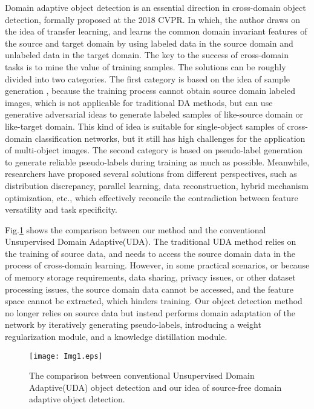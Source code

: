 \documentclass[sn-mathphys]{sn-jnl}%
\theoremstyle{thmstyleone}%
\theoremstyle{thmstyletwo}%
\theoremstyle{thmstylethree}%
\begin{document}
Domain adaptive object detection is an essential direction in cross-domain object detection, formally proposed at the 2018 CVPR\cite{chen2018domain}. In which, the author draws on the idea of transfer learning, and learns the common domain invariant features of the source and target domain by using labeled data in the source domain and unlabeled data in the target domain. The key to the success of cross-domain tasks is to mine the value of training samples. The solutions can be roughly divided into two categories. The first category is based on the idea of sample generation \cite{hou2021visualizing,kurmi2021domain,li2020model,kim2021domain}, because the training process cannot obtain source domain labeled images, which is not applicable for traditional DA methods\cite{xu2020exploring}, but can use generative adversarial ideas to generate labeled samples of like-source domain or like-target domain. This kind of idea is suitable for single-object samples of cross-domain classification networks, but it still has high challenges for the application of multi-object images. The second category is based on pseudo-label generation\cite{liang2020we,he2020domain} to generate reliable pseudo-labels during training as much as possible. Meanwhile, researchers have proposed several solutions from different perspectives, such as distribution discrepancy, parallel learning, data reconstruction, hybrid mechanism optimization, etc.\cite{han2019image,ben2019demystifying}, which effectively reconcile the contradiction between feature versatility and task specificity.

Fig.\ref{fig1} shows the comparison between our method and the conventional Unsupervised Domain Adaptive(UDA). The traditional UDA method relies on the training of source data, and needs to access the source domain data in the process of cross-domain learning. However, in some practical scenarios, or because of memory storage requirements, data sharing, privacy issues, or other dataset processing issues, the source domain data cannot be accessed, and the feature space cannot be extracted, which hinders training. Our object detection method no longer relies on source data but instead performs domain adaptation of the network by iteratively generating pseudo-labels, introducing a weight regularization module, and a knowledge distillation module.


\begin{figure}
	\texttt{[image: Img1.eps]}
	\caption{The comparison between conventional Unsupervised Domain Adaptive(UDA) object detection and our idea of source-free domain adaptive object detection.} \label{fig1}
\end{figure}
\end{document}
